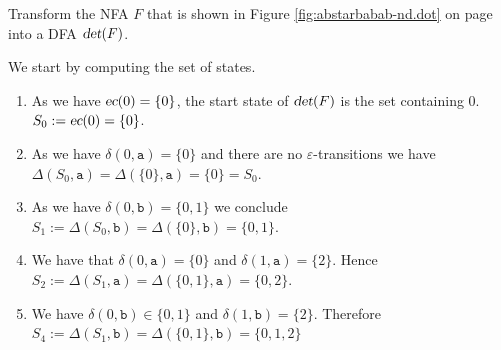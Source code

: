 \exerciseEng
Transform the \textsc{NFA} $F$ that is shown in Figure \ref{fig:abstarbabab-nd.dot} on page
\pageref{fig:abstarbabab-nd.dot}  into a \textsc{DFA} $\textsl{det}(F)$.  \eox

\solutionEng
We start by computing the set of states.
\begin{enumerate}
\item As we have $\textsl{ec}(0) = \{0\}$, the start state of $\textsl{det}(F)$  is the set containing $0$.
      \\[0.2cm]
      \hspace*{1.3cm}
      $S_0 := \textsl{ec}(0) = \{ 0 \}$.
\item As we have $\delta(0, \texttt{a}) = \{0\}$ and there are no $\varepsilon$-transitions we have
      \\[0.2cm]
      \hspace*{1.3cm}
      $\Delta(S_0, \texttt{a}) = \Delta(\{0\}, \texttt{a}) = \{0\} = S_0$.
\item As we have $\delta(0, \texttt{b}) = \{0, 1\}$ we conclude
      \\[0.2cm]
      \hspace*{1.3cm}
      $S_1 := \Delta(S_0, \texttt{b}) = \Delta(\{0\}, \texttt{b}) = \{ 0, 1 \}$.
\item We have that $\delta(0, \texttt{a}) = \{ 0 \}$ and $\delta(1, \texttt{a}) = \{ 2 \}$.
      Hence
      \\[0.2cm]
      \hspace*{1.3cm}
      $S_2 := \Delta(S_1, \texttt{a}) = \Delta(\{ 0, 1 \}, \texttt{a}) = \{ 0, 2 \}$.
\item We have $\delta(0, \texttt{b}) \in \{ 0, 1 \}$ and $\delta(1, \texttt{b}) = \{ 2 \}$.
      Therefore
      \\[0.2cm]
      \hspace*{1.3cm}
      $S_4 := \Delta(S_1, \texttt{b}) = \Delta(\{ 0, 1 \}, \texttt{b}) = \{ 0, 1, 2 \}$


\end{enumerate}
